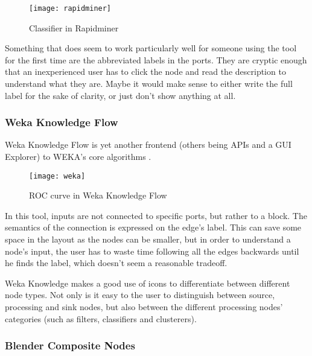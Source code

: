 \begin{itemsize}
\begin{figure}[t]
  \begin{center}
    \leavevmode
    \texttt{[image: rapidminer]}
    \caption{Classifier in Rapidminer \cite{rapidminer}}
    \label{fig:rapidminer}
  \end{center}
\end{figure}

Something that does seem to work particularly well for someone using the tool
for the first time are the abbreviated labels in the ports. They are cryptic
enough that an inexperienced user has to click the node and read the description
to understand what they are. Maybe it would make sense to either write the full
label for the sake of clarity, or just don't show anything at all.

\subsubsection{Weka Knowledge Flow}

Weka Knowledge Flow is yet another frontend (others being APIs and a GUI Explorer)
to WEKA's core algorithms \cite{weka}.

\begin{figure}[t]
  \begin{center}
    \leavevmode
    \texttt{[image: weka]}
    \caption{ROC curve in Weka Knowledge Flow \cite{weka}}
    \label{fig:weka}
  \end{center}
\end{figure}

In this tool, inputs are not connected to specific ports, but rather to a block.
The semantics of the connection is expressed on the edge's label. This can save
some space in the layout as the nodes can be smaller, but in order to understand
a node's input, the user has to waste time following all the edges backwards
until he finds the label, which doesn't seem a reasonable tradeoff.

Weka Knowledge makes a good use of icons to differentiate between different node
types. Not only is it easy to the user to distinguish between source, processing
and sink nodes, but also between the different processing nodes' categories
(such as filters, classifiers and clusterers).

\subsubsection{Blender Composite Nodes}


\end{itemsize}
